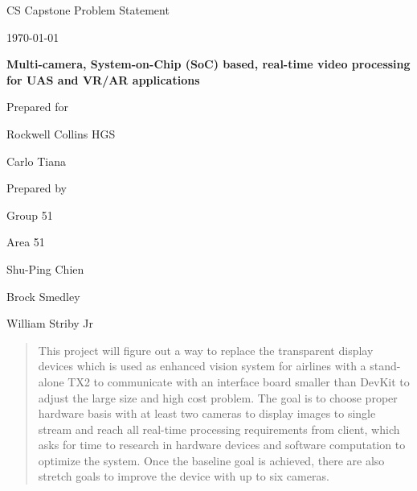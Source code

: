 \documentclass[onecolumn, draftclsnofoot,10pt, compsoc]{IEEEtran}
\def \CapstoneTeamName{		Area 51}
\def \CapstoneTeamNumber{		51}
\def \GroupMemberOne{			Shu-Ping Chien}
\def \GroupMemberTwo{			Brock Smedley}
\def \GroupMemberThree{			William Striby Jr}
\def \CapstoneProjectName{		Multi-camera, System-on-Chip (SoC) based, real-time video processing for UAS and VR/AR applications}
\def \CapstoneSponsorCompany{	Rockwell Collins HGS}
\def \CapstoneSponsorPerson{		Carlo Tiana}
\def \DocType{		Problem Statement
				}
\newcommand{\NameSigPair}[1]{\par
\makebox[2.75in][r]{#1} \hfil 	\makebox[3.25in]{\makebox[2.25in]{\hrulefill} \hfill		\makebox[.75in]{\hrulefill}}
\par\vspace{-12pt} \textit{\tiny\noindent
\makebox[2.75in]{} \hfil		\makebox[3.25in]{\makebox[2.25in][r]{Signature} \hfill	\makebox[.75in][r]{Date}}}}
\renewcommand{\NameSigPair}[1]{#1}
\begin{document}
\begin{titlepage}
    \begin{singlespace}
        \hfill
        \par\vspace{.2in}
        \centering
        \scshape{
            \huge CS Capstone \DocType \par
            {\large\today}\par
            \vspace{.5in}
            \textbf{\Huge\CapstoneProjectName}\par
            \vfill
            {\large Prepared for}\par
            \Huge \CapstoneSponsorCompany\par
            \vspace{5pt}
            {\Large\NameSigPair{\CapstoneSponsorPerson}\par}
            {\large Prepared by }\par
            Group\CapstoneTeamNumber\par
            \CapstoneTeamName\par
            \vspace{5pt}
            {\Large
                \NameSigPair{\GroupMemberOne}\par
                \NameSigPair{\GroupMemberTwo}\par
                \NameSigPair{\GroupMemberThree}\par
            }
            \vspace{20pt}
        }
        \begin{abstract}
        	This project will figure out a way to replace the transparent display devices which is used as enhanced vision system for airlines with a stand-alone TX2 to communicate with an interface board smaller than DevKit to adjust the large size and high cost problem. The goal is to choose proper hardware basis with at least two cameras to display images to single stream and reach all real-time processing requirements from client, which asks for time to research in hardware devices and software computation to optimize the system. Once the baseline goal is achieved, there are also stretch goals to improve the device with up to six cameras.
        \end{abstract}
    \end{singlespace}
\end{titlepage}
\newpage
{}
\clearpage
\end{document}
